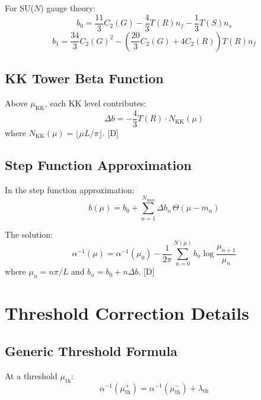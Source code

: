 \documentclass[11pt,a4paper]{article}
\begin{document}
For SU($N$) gauge theory:
\begin{equation}
b_0 = \frac{11}{3}C_2(G) - \frac{4}{3}T(R)n_f - \frac{1}{3}T(S)n_s
\label{eq:b0-formula}
\end{equation}
\begin{equation}
b_1 = \frac{34}{3}C_2(G)^2 - \left(\frac{20}{3}C_2(G) + 4C_2(R)\right)T(R)n_f
\label{eq:b1-formula}
\end{equation}

\subsection{KK Tower Beta Function}

Above $\mu_{\text{KK}}$, each KK level contributes:
\begin{equation}
\Delta b = -\frac{4}{3}T(R) \cdot N_{\text{KK}}(\mu)
\label{eq:kk-beta}
\end{equation}
where $N_{\text{KK}}(\mu) = \lfloor \mu L/\pi \rfloor$. [D]

\subsection{Step Function Approximation}

In the step function approximation:
\begin{equation}
b(\mu) = b_0 + \sum_{n=1}^{N_{\text{max}}} \Delta b_n\, \Theta(\mu - m_n)
\label{eq:step-beta}
\end{equation}

The solution:
\begin{equation}
\alpha^{-1}(\mu) = \alpha^{-1}(\mu_0) - \frac{1}{2\pi}\sum_{n=0}^{N(\mu)} b_n \log\frac{\mu_{n+1}}{\mu_n}
\label{eq:step-solution}
\end{equation}
where $\mu_n = n\pi/L$ and $b_n = b_0 + n\Delta b$. [D]

\section{Threshold Correction Details}
\label{app:threshold-detail}

\subsection{Generic Threshold Formula}

At a threshold $\mu_{\text{th}}$:
\begin{equation}
\alpha^{-1}(\mu_{\text{th}}^+) = \alpha^{-1}(\mu_{\text{th}}^-) + \lambda_{\text{th}}
\label{eq:threshold-generic}
\end{equation}
\end{document}
